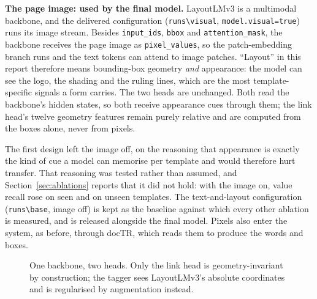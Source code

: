 \documentclass[11pt,a4paper]{article}
\newcommand{\code}[1]{\texttt{\small #1}}
\begin{document}
\textbf{The page image: used by the final model.} LayoutLMv3 is a multimodal backbone, and the
delivered configuration (\code{runs\textbackslash visual}, \code{model.visual=true}) runs its image
stream. Besides \code{input\_ids}, \code{bbox} and \code{attention\_mask}, the backbone receives the
page image as \code{pixel\_values}, so the patch-embedding branch runs and the text tokens can
attend to image patches. ``Layout'' in this report therefore means bounding-box geometry
\emph{and} appearance: the model can see the logo, the shading and the ruling lines, which are the
most template-specific signals a form carries. The two heads are unchanged. Both read the
backbone's hidden states, so both receive appearance cues through them; the link head's twelve
geometry features remain purely relative and are computed from the boxes alone, never from pixels.

The first design left the image off, on the reasoning that appearance is exactly the kind of cue a
model can memorise per template and would therefore hurt transfer. That reasoning was tested
rather than assumed, and Section~\ref{sec:ablations} reports that it did not hold: with the image
on, value recall rose on seen and on unseen templates. The text-and-layout configuration
(\code{runs\textbackslash base}, image off) is kept as the baseline against which every other
ablation is measured, and is released alongside the final model. Pixels also enter the system, as
before, through docTR, which reads them to produce the words and boxes.

\begin{figure}[htbp]
\centering
{}
\caption{One backbone, two heads. Only the link head is geometry-invariant by construction; the
tagger sees LayoutLMv3's absolute coordinates and is regularised by augmentation instead.}
\label{fig:arch}
\end{figure}
\end{document}
